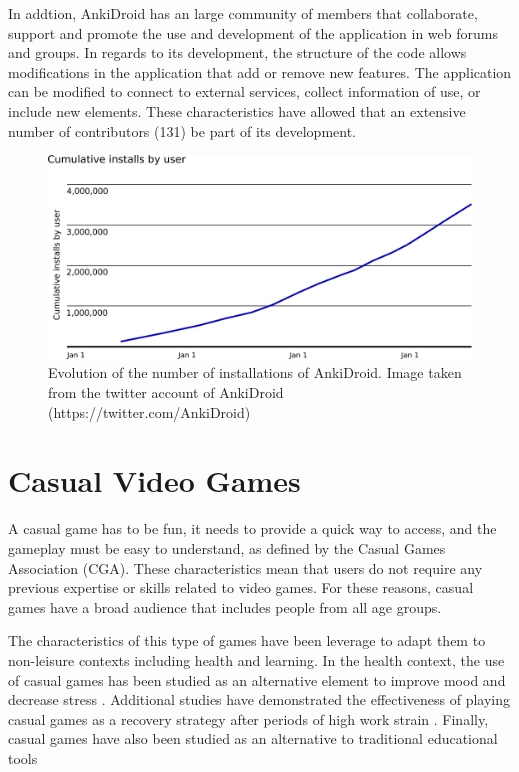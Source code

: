 In addtion, AnkiDroid has an large community of members that collaborate, support and promote the use and development of the application in web forums and groups. In regards to its development, the structure of the code allows modifications in the application that add or remove new features. The application can be modified to connect to external services, collect information of use, or include new elements. These characteristics have allowed that an extensive number of contributors (131) be part of its development.

\begin{figure}[htb]
    \vskip 5mm
        \begin{center}
            \includegraphics[scale=0.4]{./Figures/anki_progress.png}
            \caption{Evolution of the number of installations of AnkiDroid. Image taken from the twitter account of AnkiDroid (https://twitter.com/AnkiDroid)}
            \label{fig:anki-evolution}
        \end{center}
    \vskip -5mm
\end{figure}


\section{Casual Video Games}
A casual game has to be fun, it needs to provide a quick way to access, and the gameplay must be easy to understand, as defined by the Casual Games Association (CGA). These characteristics mean that users do not require any previous expertise or skills related to video games. For these reasons, casual games have a broad audience that includes people from all age groups.

The characteristics of this type of games have been leverage to adapt them to non-leisure contexts including health and learning. In the health context, the use of casual games has been studied as an alternative element to improve mood and decrease stress \citep{russoniello2009effectiveness}. Additional studies have demonstrated the effectiveness of playing casual games as a recovery strategy after periods of high work strain \citep{reinecke2009games}. Finally, casual games have also been studied as an alternative to traditional educational tools \citep{peirce2010personalised}

